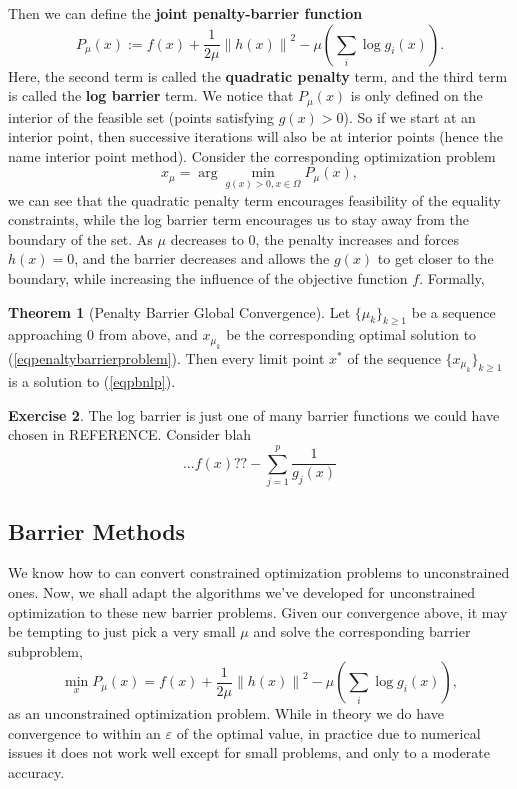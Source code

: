 \documentclass{article}
\numberwithin{equation}{section}
\theoremstyle{definition}
\newtheorem{theorem}{Theorem}[section]
\newtheorem{exercise}[theorem]{Exercise}
\newcommand{\norm}[1]{\left\lVert#1\right\rVert}
\begin{document}
Then we can define the \textbf{joint penalty-barrier function}
\begin{equation}
    P_\mu(x):=f(x)+\frac1{2\mu}\norm{h(x)}^2-\mu\left(\sum_i\log g_i(x)\right).
\end{equation}
Here, the second term is called the \textbf{quadratic penalty} term, and the third term is called the \textbf{log barrier} term. We notice that $P_\mu(x)$ is only defined on the interior of the feasible set (points satisfying $g(x)>0$). So if we start at an interior point, then successive iterations will also be at interior points (hence the name interior point method). Consider the corresponding optimization problem
\begin{equation}
    \label{eqpenaltybarrierproblem}
    x_\mu=\arg\min_{g(x)>0,x\in\Omega}P_\mu(x),
\end{equation}
we can see that the quadratic penalty term encourages feasibility of the equality constraints, while the log barrier term encourages us to stay away from the boundary of the set. As $\mu$ decreases to $0$, the penalty increases and forces $h(x)=0$, and the barrier decreases and allows the $g(x)$ to get closer to the boundary, while increasing the influence of the objective function $f$. Formally,
\begin{theorem}[Penalty Barrier Global Convergence]
    Let $\{\mu_k\}_{k\ge1}$ be a sequence approaching $0$ from above, and $x_{\mu_k}$ be the corresponding optimal solution to (\ref{eqpenaltybarrierproblem}). Then every limit point $x^*$ of the sequence $\{x_{\mu_k}\}_{k\ge1}$ is a solution to (\ref{eqpbnlp}).
\end{theorem}

\begin{exercise}
The log barrier is just one of many barrier functions we could have chosen in REFERENCE. Consider blah
\begin{equation}
    ...f(x)??- \sum_{j=1}^p\frac1{g_j(x)}
\end{equation}
\end{exercise}
\subsection{Barrier Methods}
We know how to can convert constrained optimization problems to unconstrained ones. Now, we shall adapt the algorithms we've developed for unconstrained optimization to these new barrier problems. Given our convergence above, it may be tempting to just pick a very small $\mu$ and solve the corresponding barrier subproblem,
\begin{equation}
    \min_x P_\mu(x)=f(x)+\frac1{2\mu}\norm{h(x)}^2-\mu\left(\sum_i\log g_i(x)\right),
\end{equation}
as an unconstrained optimization problem. While in theory we do have convergence to within an $\varepsilon$ of the optimal value, in practice due to numerical issues it does not work well except for small problems, and only to a moderate accuracy.
\end{document}
